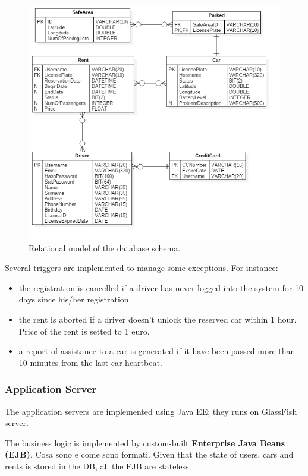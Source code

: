 \begin{figure}[H]
	\centering
	\includegraphics[width=\textwidth, keepaspectratio]{diagrams/Relational.png}
	\caption{Relational model of the database schema.}
	\label {fig:relational}
\end{figure}

Several triggers are implemented to manage some exceptions. For instance:
\begin{itemize}
	\item the registration is cancelled if a driver has never logged into the system for 10 days since his/her registration.
	\item the rent is aborted if a driver doesn't unlock the reserved car within 1 hour. Price of the rent is setted to 1 euro.
	\item a report of assistance to a car is generated if it have been passed more than 10 minutes from the last car heartbeat.
\end{itemize}

\subsubsection{Application Server}

The application servers are implemented using Java EE; they runs on GlassFish server.

The business logic is implemented by custom-built \textbf{Enterprise Java Beans (EJB)}. Cosa sono e come sono formati. Given that the state of users, cars and rents is stored in the DB, all the EJB are stateless.


